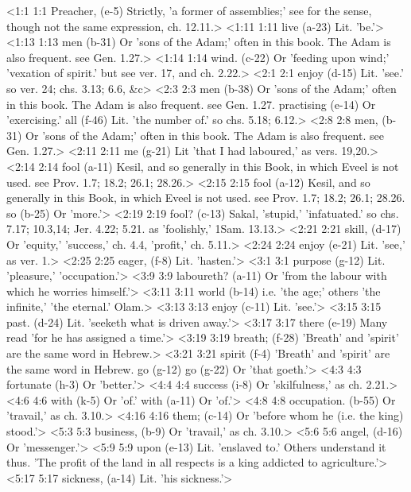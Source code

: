 <1:1 1:1  Preacher, (e-5)  Strictly, 'a former of assemblies;' see for the sense, though  not the same expression, ch. 12.11.>
<1:11 1:11  live (a-23)  Lit. 'be.'>
<1:13 1:13  men (b-31)  Or 'sons of the Adam;' often in this book. The Adam is  also frequent. see Gen. 1.27.>
<1:14 1:14  wind. (c-22)  Or 'feeding upon wind;' 'vexation of spirit.' but see ver.  17, and ch. 2.22.>
<2:1 2:1  enjoy (d-15)  Lit. 'see.' so ver. 24; chs. 3.13; 6.6, &c>
<2:3 2:3  men (b-38)  Or 'sons of the Adam;' often in this book. The Adam is  also frequent. see Gen. 1.27.
  practising (e-14)  Or 'exercising.'
  all (f-46)  Lit. 'the number of.' so chs. 5.18; 6.12.>
<2:8 2:8  men, (b-31)  Or 'sons of the Adam;' often in this book. The Adam is  also frequent. see Gen. 1.27.>
<2:11 2:11  me (g-21)  Lit 'that I had laboured,' as vers. 19,20.>
<2:14 2:14  fool (a-11)  Kesil, and so generally in this Book, in which Eveel is  not used. see Prov. 1.7; 18.2; 26.1; 28.26.>
<2:15 2:15  fool (a-12)  Kesil, and so generally in this Book, in which Eveel is  not used. see Prov. 1.7; 18.2; 26.1; 28.26.
  so (b-25)  Or 'more.'>
<2:19 2:19  fool? (c-13)  Sakal, 'stupid,' 'infatuated.' so chs. 7.17; 10.3,14; Jer.  4.22; 5.21. as 'foolishly,' 1Sam. 13.13.>
<2:21 2:21  skill, (d-17)  Or 'equity,' 'success,' ch. 4.4, 'profit,' ch. 5.11.>
<2:24 2:24  enjoy (e-21)  Lit. 'see,' as ver. 1.>
<2:25 2:25  eager, (f-8)  Lit. 'hasten.'>
<3:1 3:1  purpose (g-12)  Lit. 'pleasure,' 'occupation.'>
<3:9 3:9  laboureth? (a-11)  Or 'from the labour with which he worries himself.'>
<3:11 3:11  world (b-14)  i.e. 'the age;' others 'the infinite,' 'the eternal.' Olam.>
<3:13 3:13  enjoy (c-11)  Lit. 'see.'>
<3:15 3:15  past. (d-24)  Lit. 'seeketh what is driven away.'>
<3:17 3:17  there (e-19)  Many read 'for he has assigned a time.'>
<3:19 3:19  breath; (f-28)  'Breath' and 'spirit' are the same word in Hebrew.>
<3:21 3:21  spirit (f-4)  'Breath' and 'spirit' are the same word in Hebrew.
  go (g-12)  go (g-22)
  Or 'that goeth.'>
<4:3 4:3  fortunate (h-3)  Or 'better.'>
<4:4 4:4  success (i-8)  Or 'skilfulness,' as ch. 2.21.>
<4:6 4:6  with (k-5)  Or 'of.'
  with (a-11)  Or 'of.'>
<4:8 4:8  occupation. (b-55) Or 'travail,' as ch. 3.10.>
<4:16 4:16  them; (c-14)  Or 'before whom he (i.e. the king) stood.'>
<5:3 5:3  business, (b-9)  Or 'travail,' as ch. 3.10.>
<5:6 5:6  angel, (d-16)  Or 'messenger.'>
<5:9 5:9  upon (e-13)  Lit. 'enslaved to.' Others understand it thus. 'The profit of  the land in all respects is a king addicted to agriculture.'>
<5:17 5:17  sickness, (a-14)  Lit. 'his sickness.'>
